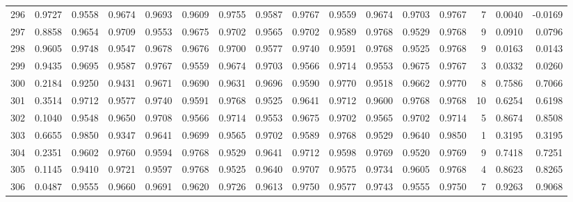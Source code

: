 \begin{tabular}{lrrrrrrrrrrrrrrr}
296 &      0.9727 &  0.9558 &  0.9674 &  0.9693 &  0.9609 &  0.9755 &  0.9587 &  0.9767 &  0.9559 &  0.9674 &   0.9703 &     0.9767 &      7 &                    0.0040 &                    -0.0169 \\
297 &      0.8858 &  0.9654 &  0.9709 &  0.9553 &  0.9675 &  0.9702 &  0.9565 &  0.9702 &  0.9589 &  0.9768 &   0.9529 &     0.9768 &      9 &                    0.0910 &                     0.0796 \\
298 &      0.9605 &  0.9748 &  0.9547 &  0.9678 &  0.9676 &  0.9700 &  0.9577 &  0.9740 &  0.9591 &  0.9768 &   0.9525 &     0.9768 &      9 &                    0.0163 &                     0.0143 \\
299 &      0.9435 &  0.9695 &  0.9587 &  0.9767 &  0.9559 &  0.9674 &  0.9703 &  0.9566 &  0.9714 &  0.9553 &   0.9675 &     0.9767 &      3 &                    0.0332 &                     0.0260 \\
300 &      0.2184 &  0.9250 &  0.9431 &  0.9671 &  0.9690 &  0.9631 &  0.9696 &  0.9590 &  0.9770 &  0.9518 &   0.9662 &     0.9770 &      8 &                    0.7586 &                     0.7066 \\
301 &      0.3514 &  0.9712 &  0.9577 &  0.9740 &  0.9591 &  0.9768 &  0.9525 &  0.9641 &  0.9712 &  0.9600 &   0.9768 &     0.9768 &     10 &                    0.6254 &                     0.6198 \\
302 &      0.1040 &  0.9548 &  0.9650 &  0.9708 &  0.9566 &  0.9714 &  0.9553 &  0.9675 &  0.9702 &  0.9565 &   0.9702 &     0.9714 &      5 &                    0.8674 &                     0.8508 \\
303 &      0.6655 &  0.9850 &  0.9347 &  0.9641 &  0.9699 &  0.9565 &  0.9702 &  0.9589 &  0.9768 &  0.9529 &   0.9640 &     0.9850 &      1 &                    0.3195 &                     0.3195 \\
304 &      0.2351 &  0.9602 &  0.9760 &  0.9594 &  0.9768 &  0.9529 &  0.9641 &  0.9712 &  0.9598 &  0.9769 &   0.9520 &     0.9769 &      9 &                    0.7418 &                     0.7251 \\
305 &      0.1145 &  0.9410 &  0.9721 &  0.9597 &  0.9768 &  0.9525 &  0.9640 &  0.9707 &  0.9575 &  0.9734 &   0.9605 &     0.9768 &      4 &                    0.8623 &                     0.8265 \\
306 &      0.0487 &  0.9555 &  0.9660 &  0.9691 &  0.9620 &  0.9726 &  0.9613 &  0.9750 &  0.9577 &  0.9743 &   0.9555 &     0.9750 &      7 &                    0.9263 &                     0.9068 \\

\end{tabular}
